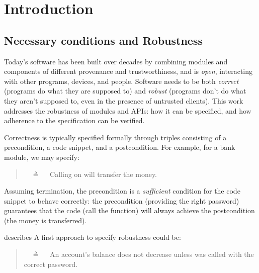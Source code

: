 \section{Introduction}
\label{s:intro}

\subsection{Necessary conditions and Robustness} 
Today's   software has been built 
over decades by combining modules and components of
different provenance and 
trustworthiness, and
is \emph{open}, interacting with other programs, devices, and people.
{Software needs} to be both  {\emph{correct}} ({programs do what they are supposed to}) and   
{\emph{robust}} ({programs don't do what they aren't supposed to, even in the presence of untrusted  {clients}}).  
 {This work  addresses the robustness of modules and APIs: {how it can be specified, and how adherence to the specification can be verified}.}

 {Correctness is} typically specified formally 
 through  triples consisting of a  precondition, a code snippet, and a
 postcondition. 
 For example,  {for a bank module,  we may specify:}
 \begin{quote}
\Scorrect\ \ $\triangleq$ \ \ Calling  on  will transfer the money.
\end{quote}
Assuming termination, the precondition is a \emph{sufficient} condition for the {code snippet to behave correctly}: 
the precondition (\eg providing the right 
password) guarantees that
the code (\eg call the  function)
will always achieve the postcondition (the money is transferred).
 
    \vspace{.05in}
 
\Scorrect  describes 
 A first approach to specify robustness could be:
 

\begin{quote}
\SrobustA\ \ $\triangleq$ \ \ An account's balance does not decrease unless  was called 
with the correct password.
\end{quote}

